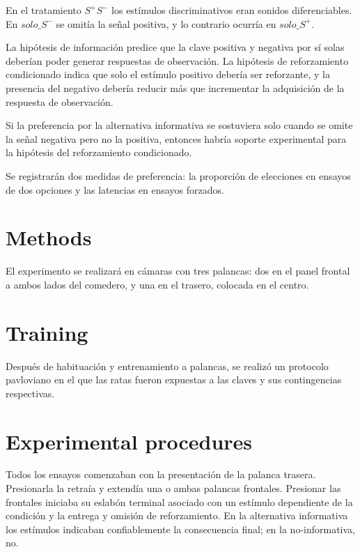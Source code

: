 \documentclass[a4paper,12pt]{article}
\begin{document}
En el tratamiento $S^{+}S^{-}$ los estímulos discriminativos eran sonidos diferenciables. En $solo\_S^{-}$ se omitía la señal positiva, y lo contrario ocurría en $solo\_S^{+}$.

La hipótesis de información predice que la clave positiva y negativa por sí solas deberían poder generar respuestas de observación. La hipótesis de reforzamiento condicionado indica que solo el estímulo positivo debería ser reforzante, y la presencia del negativo debería reducir más que incrementar la adquisición de la respuesta de observación.

Si la preferencia por la alternativa informativa se sostuviera solo cuando se omite la señal negativa pero no la positiva, entonces habría soporte experimental para la hipótesis del reforzamiento condicionado.

Se registrarán dos medidas de preferencia: la proporción de elecciones en ensayos de dos opciones y las latencias en ensayos forzados.

\section{Methods}\label{methods}

El experimento se realizará en cámaras con tres palancas: dos en el panel frontal a ambos lados del comedero, y una en el trasero, colocada en el centro.

\section{Training}\label{training}

Después de habituación y entrenamiento a palancas, se realizó un protocolo pavloviano en el que las ratas fueron expuestas a las claves y sus contingencias respectivas.

\section{Experimental procedures}\label{experimentalProcedures}

Todos los ensayos comenzaban con la presentación de la palanca trasera. Presionarla la retraía y extendía una o ambas palancas frontales. Presionar las frontales iniciaba su eslabón terminal asociado con un estímulo dependiente de la condición y la entrega y omisión de reforzamiento. En la alternativa informativa los estímulos indicaban confiablemente la consecuencia final; en la no-informativa, no.
\end{document}
